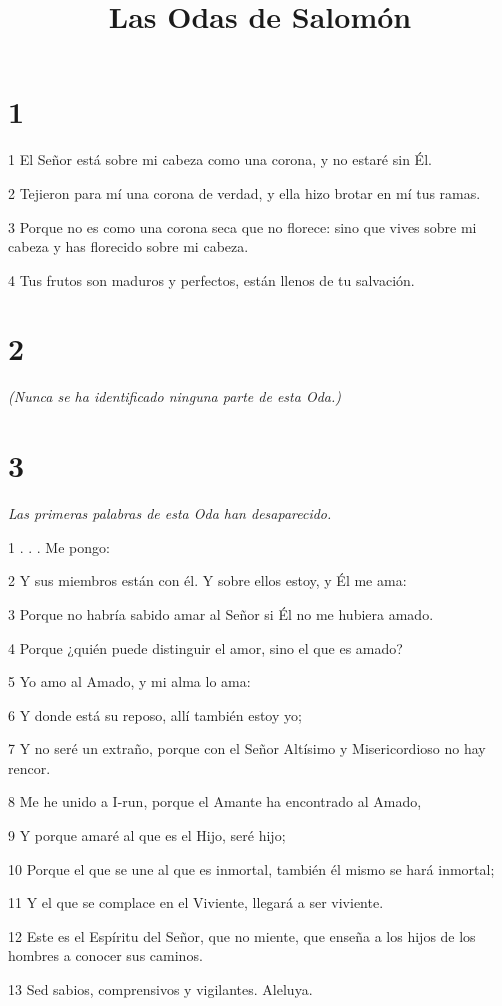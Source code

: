 

\title{Las Odas de Salomón}

\chapter{1}

\par 1 El Señor está sobre mi cabeza como una corona, y no estaré sin Él.
\par 2 Tejieron para mí una corona de verdad, y ella hizo brotar en mí tus ramas.
\par 3 Porque no es como una corona seca que no florece: sino que vives sobre mi cabeza y has florecido sobre mi cabeza.
\par 4 Tus frutos son maduros y perfectos, están llenos de tu salvación.



\chapter{2}

\par \textit{(Nunca se ha identificado ninguna parte de esta Oda.)}

\chapter{3}

\par \textit{Las primeras palabras de esta Oda han desaparecido.}

\par 1 . . . Me pongo:
\par 2 Y sus miembros están con él. Y sobre ellos estoy, y Él me ama:
\par 3 Porque no habría sabido amar al Señor si Él no me hubiera amado.
\par 4 Porque ¿quién puede distinguir el amor, sino el que es amado?
\par 5 Yo amo al Amado, y mi alma lo ama:
\par 6 Y donde está su reposo, allí también estoy yo;
\par 7 Y no seré un extraño, porque con el Señor Altísimo y Misericordioso no hay rencor.
\par 8 Me he unido a I-run, porque el Amante ha encontrado al Amado,
\par 9 Y porque amaré al que es el Hijo, seré hijo;
\par 10 Porque el que se une al que es inmortal, también él mismo se hará inmortal;
\par 11 Y el que se complace en el Viviente, llegará a ser viviente.
\par 12 Este es el Espíritu del Señor, que no miente, que enseña a los hijos de los hombres a conocer sus caminos.
\par 13 Sed sabios, comprensivos y vigilantes. Aleluya.

